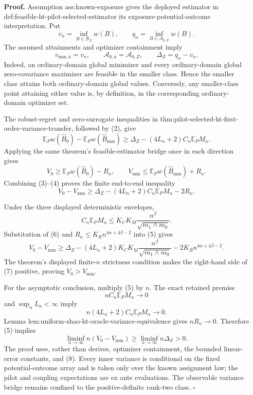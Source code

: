 \textbf{Proof.}
Assumption ass:known-exposure gives the deployed estimator in def:feasible-ht-pilot-selected-estimator its exposure-potential-outcome interpretation.  Put
\[
v_n=\inf_{B\in\mathcal B_Z}w(B),
\qquad
q_n=\inf_{B\in\mathcal A_{0,Z}}w(B).
\tag{1}
\]
The assumed attainments and optimizer containment imply
\[
v_{\mathrm{mm},\overline a}=v_n,
\qquad
\mathcal A_{0,\overline a}=\mathcal A_{0,Z},
\qquad
\Delta_Z=q_n-v_n.
\tag{2}
\]
Indeed, an ordinary-domain global minimizer and every ordinary-domain global zero-covariance maximizer are feasible in the smaller class.  Hence the smaller class attains both ordinary-domain global values.  Conversely, any smaller-class point attaining either value is, by definition, in the corresponding ordinary-domain optimizer set.

The robust-regret and zero-surrogate inequalities in thm:pilot-selected-ht-first-order-variance-transfer, followed by (2), give
\[
\mathbb E_Pw(\widehat B_0)
-\mathbb E_Pw(\widehat B_{\mathrm{mm}})
\ge
\Delta_Z-(4L_n+2)C_n\mathbb E_PM_n.
\tag{3}
\]
Applying the same theorem's feasible-estimator bridge once in each direction gives
\[
V_0\ge\mathbb E_Pw(\widehat B_0)-R_n,
\qquad
V_{\mathrm{mm}}\le\mathbb E_Pw(\widehat B_{\mathrm{mm}})+R_n.
\tag{4}
\]
Combining (3)--(4) proves the finite end-to-end inequality
\[
V_0-V_{\mathrm{mm}}
\ge
\Delta_Z-(4L_n+2)C_n\mathbb E_PM_n-2R_n.
\tag{5}
\]

Under the three displayed deterministic envelopes,
\[
C_n\mathbb E_PM_n
\le K_CK_M\frac{n^\beta}{\sqrt{m_1\wedge m_0}}.
\tag{6}
\]
Substitution of (6) and \(R_n\le K_Rn^{4\alpha+4\beta-2}\) into (5) gives
\[
V_0-V_{\mathrm{mm}}
\ge \Delta_Z
-(4L_n+2)K_CK_M\frac{n^\beta}{\sqrt{m_1\wedge m_0}}
-2K_Rn^{4\alpha+4\beta-2}.
\tag{7}
\]
The theorem's displayed finite-\(n\) strictness condition makes the right-hand side of (7) positive, proving \(V_0>V_{\mathrm{mm}}\).

For the asymptotic conclusion, multiply (5) by \(n\).  The exact retained premise
\[
nC_n\mathbb E_PM_n\longrightarrow0
\tag{8}
\]
and \(\sup_nL_n<\infty\) imply
\[
n(4L_n+2)C_n\mathbb E_PM_n\longrightarrow0.
\tag{9}
\]
Lemma lem:uniform-zhao-ht-oracle-variance-equivalence gives \(nR_n\to0\).  Therefore (5) implies
\[
\liminf_{n\to\infty}n(V_0-V_{\mathrm{mm}})
\ge\liminf_{n\to\infty}n\Delta_Z>0.
\tag{10}
\]
The proof uses, rather than derives, optimizer containment, the bounded linear-error constants, and (8).  Every inner variance is conditional on the fixed potential-outcome array and is taken only over the known assignment law; the pilot and coupling expectations are ex ante evaluations.  The observable variance bridge remains confined to the positive-definite rank-two class. \(\square\)